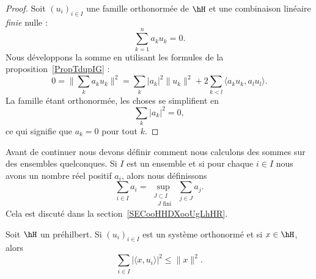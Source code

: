\begin{proof}
	Soit \( (u_i)_{i\in I}\) une famille orthonormée de \( \hH\) et une combinaison linéaire \emph{finie} nulle :
	\begin{equation}
		\sum_{k=1}^{n}a_ku_k=0.
	\end{equation}
	Nous développons la somme en utilisant les formules de la proposition~\ref{PropTdupIG} :
	\begin{equation}
		0=\| \sum_ka_ku_k \|^2=\sum_k| a_k |^2\| u_k \|^2+2\sum_{k<l}\langle a_ku_k, a_lu_l\rangle .
	\end{equation}
	La famille étant orthonormée, les choses se simplifient en
	\begin{equation}
		\sum_k| a_k |^2=0,
	\end{equation}
	ce qui signifie que \( a_k=0\) pour tout \( k\).
\end{proof}

Avant de continuer nous devons définir comment nous calculons des sommes sur des ensembles quelconques. Si \( I\) est un ensemble et si pour chaque \( i\in I\) nous avons un nombre réel positif \( a_i\), alors nous définissons
\begin{equation}
	\sum_{i\in I}a_i=\sup_{\substack{J\subset I\\\text{ } J\text{ fini }}}\sum_{j\in J} a_j.
\end{equation}
Cela est discuté dans la section~\ref{SECooHHDXooUgLhHR}.

\begin{proposition}    \label{PropHKqVHj}
	Soit \( \hH\) un préhilbert. Si \( (u_i)_{i\in I}\) est un système orthonormé et si \( x\in \hH\), alors
	\begin{equation}        \label{EQooWCYZooOPzGaw}
		\sum_{i\in I}\big| \langle x, u_i\rangle  \big|^2\leq \| x \|^2.
	\end{equation}
\end{proposition}

